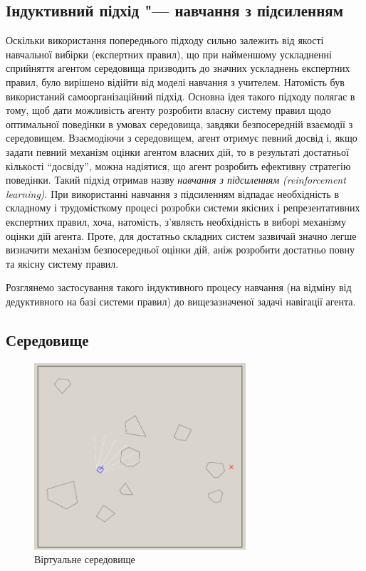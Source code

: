 \subsection{Індуктивний підхід "--- навчання з підсиленням}

Оскільки використання попереднього підходу сильно залежить від якості навчальної вибірки (експертних правил), що при найменшому ускладненні сприйняття агентом середовища призводить до значних ускладнень експертних правил, було вирішено відійти від моделі навчання з учителем. Натомість був використаний самоорганізаційний підхід. Основна ідея такого підходу полягає в тому, щоб дати можливість агенту розробити власну систему правил щодо оптимальної поведінки в умовах середовища, завдяки безпосередній взаємодії з середовищем. Взаємодіючи з середовищем, агент отримує певний досвід і, якщо задати певний механізм оцінки агентом власних дій, то в результаті достатньої кількості ``досвіду'', можна надіятися, що агент розробить ефективну стратегію поведінки. Такий підхід отримав назву \emph{навчання з підсиленням (reinforcement learning)}. При використанні навчання з підсиленням відпадає необхідність в складному і трудомісткому процесі розробки системи якісних і репрезентативних експертних правил, хоча, натомість, з'являєть необхідність в виборі механізму оцінки дій агента. Проте, для достатньо складних систем зазвичай значно легше визначити механізм безпосередньої оцінки дій, аніж розробити достатньо повну та якісну систему правил.

Розглянемо застосування такого індуктивного процесу навчання (на відміну від дедуктивного на базі системи правил) до вищезазначеної задачі навігації агента.

\subsection{Середовище}

\begin{figure}
	\centering
    \includegraphics[width=0.7\textwidth]{env_screen.png}
	\caption{Віртуальне середовище}
	\label{fig:environment}
\end{figure}

